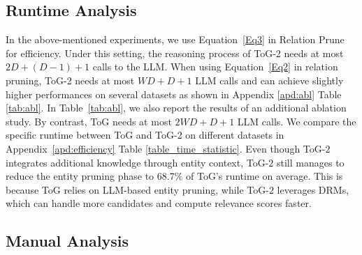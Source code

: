 \documentclass{article} %
\begin{document}
\subsection{Runtime Analysis}
In the above-mentioned experiments, we use Equation~\ref{Eq3} in Relation Prune for efficiency. Under this setting, the reasoning process of ToG-2  needs at most $2D + (D-1) + 1$ calls to the LLM. When using Equation~\ref{Eq2} in relation pruning, ToG-2 needs at most $WD+D+1$ LLM calls and can achieve slightly higher performances on several datasets as shown in Appendix \ref{apd:abl} Table \ref{tab:abl}. In Table~\ref{tab:abl}, we also report the results of an additional ablation study. By contrast,  ToG needs at most $2WD+D+1$ LLM calls. We compare the specific runtime between ToG and ToG-2 on different datasets in Appendix~\ref{apd:efficiency} Table \ref{table_time_statistic}.  Even though ToG-$2$ integrates additional knowledge through entity context, ToG-$2$ still manages to reduce the entity pruning phase to 68.7\% of ToG’s runtime on average. This is because ToG relies on LLM-based entity pruning, while ToG-$2$ leverages DRMs, which can handle more candidates and compute relevance scores faster.






\subsection{Manual Analysis}


\end{document}
